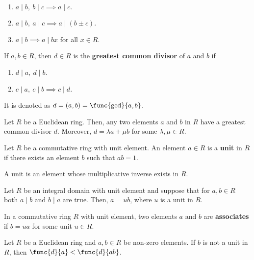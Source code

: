 \begin{remark}
    \ 
    \begin{enumerate}
        \item \(a \mid b,\ b\mid c \implies a \mid c\).
        \item \(a \mid b,\ a \mid c \implies a \mid (b \pm c)\).
        \item \(a \mid b \implies a \mid bx\) for all \(x \in R\).
    \end{enumerate}
\end{remark}

\begin{definition}
    If \(a,b \in R\), then \(d \in R\) is the \textbf{greatest common divisor} of \(a\) and \(b\) if 
    \begin{enumerate}
        \item \(d \mid a, \ d\mid b\).
        \item \(c \mid a, \ c \mid b \implies c \mid d\).
    \end{enumerate}
    It is denoted as \(d = (a,b) = \func{\gcd}{a,b}\).
\end{definition}

\begin{lemma}
    Let \(R\) be a Euclidean ring. Then, any two elements \(a\) and \(b\) in \(R\) have a greatest common divisor \(d\). Moreover, \(d = \lambda a + \mu b\) for some \(\lambda, \mu \in R\).
\end{lemma}

\begin{definition}
    Let \(R\) be a commutative ring with unit element. An element \(a \in R\) is a \textbf{unit} in \(R\) if there exists an element \(b\) such that \(ab = 1\).
\end{definition}

A unit is an element whose multiplicative inverse exists in \(R\).

\begin{lemma}
    Let \(R\) be an integral domain with unit element and suppose that for \(a,b \in R\) both \(a \mid b\) and \(b \mid a\) are true. Then, \(a = ub\), where \(u\) is a unit in \(R\).
\end{lemma}

\begin{definition}
    In a commutative ring \(R\) with unit element, two elements \(a\) and \(b\) are \textbf{associates}  if \(b = ua\) for some unit \(u \in R\).
\end{definition}

\begin{lemma}
    Let \(R\) be a Euclidean ring and \(a,b \in R\) be non-zero elements. If \(b\) is not a unit in \(R\), then \(\func{d}{a} < \func{d}{ab}\).
\end{lemma}

